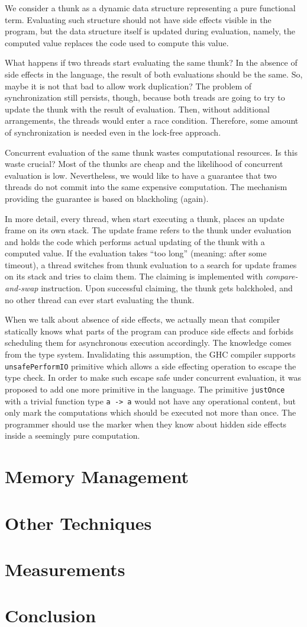 \documentclass[11pt]{extarticle}
\begin{document}
We consider a thunk as a dynamic data structure representing a pure functional term. Evaluating such structure should not have side effects visible in the program, but the data structure itself is updated during evaluation, namely, the computed value replaces the code used to compute this value.

What happens if two threads start evaluating the same thunk? In the absence of side effects in the language, the result of both evaluations should be the same. So, maybe it is not that bad to allow work duplication? The problem of synchronization still persists, though, because both treads are going to try to update the thunk with the result of evaluation. Then, without additional arrangements, the threads would enter a race condition. Therefore, some amount of synchronization is needed even in the lock-free approach.

Concurrent evaluation of the same thunk wastes computational resources. Is this waste crucial? Most of the thunks are cheap and the likelihood of concurrent evaluation is low. Nevertheless, we would like to have a guarantee that two threads do not commit into the same expensive computation. The mechanism providing the guarantee is based on blackholing (again). 

In more detail, every thread, when start executing a thunk, places an update frame on its own stack. The update frame refers to the thunk under evaluation and holds the code which performs actual updating of the thunk with a computed value. If the evaluation takes ``too long'' (meaning: after some timeout), a thread switches from thunk evaluation to a search for update frames on its stack and tries to claim them. The claiming is implemented with \textit{compare-and-swap} instruction. Upon successful claiming, the thunk gets balckholed, and no other thread can ever start evaluating the thunk.

When we talk about absence of side effects, we actually mean that compiler statically knows what parts of the program can produce side effects and forbids scheduling them for asynchronous execution accordingly. The knowledge comes from the type system. Invalidating this assumption, the GHC compiler supports \texttt{unsafePerformIO} primitive which allows a side effecting operation to escape the type check. In order to make such escape safe under concurrent evaluation, it was proposed to add one more primitive in the language. The primitive \texttt{justOnce} with a trivial function type \texttt{a -> a} would not have any operational content, but only mark the computations which should be executed not more than once. The programmer should use the marker when they know about hidden side effects inside a seemingly pure computation.

\section{Memory Management}

\section{Other Techniques}

\section{Measurements}

\section{Conclusion}
\end{document}
